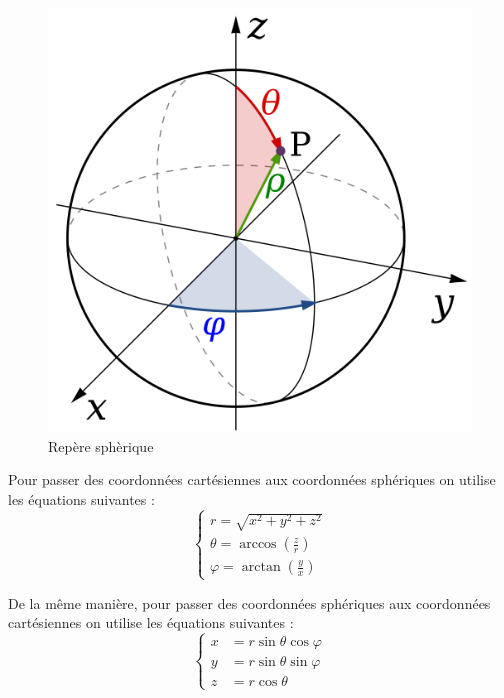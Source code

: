\documentclass[fleqn]{article}
\renewcommand{\phi}{\varphi}
\begin{document}
\begin{figure}[H]
    \centering
    \includegraphics[width = 0.3\paperwidth]{images/Spherical_Coordinates.png}
    \caption{Repère sphèrique}
\end{figure}


Pour passer des coordonnées cartésiennes aux coordonnées sphériques on utilise les équations suivantes :
\begin{equation}
    \begin{cases}
        r = \sqrt{x^2 + y^2 + z^2} \\
        \theta = \arccos \left( \frac{z}{r} \right)\\
        \phi = \arctan \left( \frac{y}{x} \right)
    \end{cases}
\end{equation}

De la même manière, pour passer des coordonnées sphériques aux coordonnées cartésiennes on utilise les équations suivantes :
\begin{equation}
    \begin{cases}
        x&=r \sin \theta \cos \varphi \\
        y&=r \sin \theta \sin \varphi \\
        z&=r \cos \theta 
    \end{cases}
    \label{Polar coord}
\end{equation}
\end{document}
